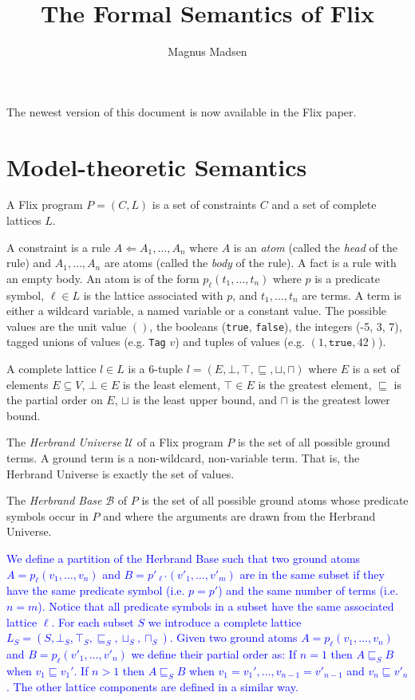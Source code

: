 \documentclass[10pt,twocolumn]{article}
\title{The Formal Semantics of Flix}
\author{Magnus Madsen}
\date{}
\begin{document}
\maketitle

The newest version of this document is now available in the Flix paper.

\section{Model-theoretic Semantics}

A Flix program $P = (C, L)$ is a set of constraints $C$ and a set of complete lattices $L$.

A constraint is a rule $A \Leftarrow A_1, \dots, A_n$ 
where $A$ is an \emph{atom} (called the \emph{head} of the rule) 
and $A_1, \dots, A_n$ are atoms (called the \emph{body} of the rule).
A fact is a rule with an empty body.
An atom is of the form $p_\ell(t_1, \dots, t_n)$ where 
$p$ is a predicate symbol,
$\ell \in L$ is the lattice associated with $p$, and
$t_1, \dots, t_n$ are terms. 
A term is either a wildcard variable, a named variable or a constant value. 
The possible values are the unit value $()$, the booleans (\texttt{true}, \texttt{false}),
the integers (-5, 3, 7), tagged unions of values (e.g. \texttt{Tag} $v$) and 
tuples of values (e.g. $(1, \texttt{true}, 42)$).

A complete lattice $l \in L$ is a 6-tuple $l = (E, \bot, \top, \sqsubseteq, \sqcup, \sqcap)$ where 
$E$ is a set of elements $E \subseteq V$,
$\bot \in E$ is the least element,
$\top \in E$ is the greatest element,
$\sqsubseteq$ is the partial order on $E$,
$\sqcup$ is the least upper bound, and
$\sqcap$ is the greatest lower bound.

The \emph{Herbrand Universe} $\mathcal{U}$ of a Flix program $P$ is the set of all possible ground terms.
A ground term is a non-wildcard, non-variable term. That is, the Herbrand Universe is exactly the set of values.

The \emph{Herbrand Base} $\mathcal{B}$ of $P$ is the set of all possible ground atoms whose
predicate symbols occur in $P$ and where the arguments are drawn from the Herbrand Universe.

\textcolor{blue}{
We define a partition of the Herbrand Base such that two ground atoms 
$A = p_\ell(v_1, \dots, v_n)$ and $B = p'_{\ell'}(v'_1, \dots, v'_m)$ are in the same subset
if they have the same predicate symbol (i.e. $p = p'$) and the same number of terms (i.e. $n = m$).
Notice that all predicate symbols in a subset have the same associated lattice $\ell$.
For each subset $S$ we introduce a complete lattice $L_S = (S, \bot_S, \top_S, \sqsubseteq_S, \sqcup_S, \sqcap_S)$.
Given two ground atoms $A = p_\ell(v_1, \dots, v_n)$ and $B = p_\ell(v'_1, \dots, v'_n)$ we define their partial order as:
If $n = 1$ then $A \sqsubseteq_S B$ when $v_1 \sqsubseteq v_1'$.
If $n > 1$ then $A \sqsubseteq_S B$ when $v_1 = v_1', \dots, v_{n - 1} = v'_{n - 1}$ and $v_n \sqsubseteq v'_n$.
The other lattice components are defined in a similar way.
}
\end{document}

